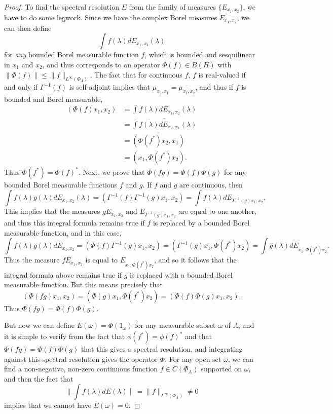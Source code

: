\begin{proof}
    To find the spectral resolution $E$ from the family of measures $\{ E_{x_1,x_2} \}$, we have to do some legwork. Since we have the complex Borel measures $E_{x_1,x_2}$, we can then define
    \[ \int f(\lambda) dE_{x_1,x_2}(\lambda) \]
    for \emph{any} bounded Borel measurable function $f$, which is bounded and sesquilinear in $x_1$ and $x_2$, and thus corresponds to an operator $\Phi(f) \in B(H)$ with $\| \Phi(f) \| \leq \| f \|_{L^\infty(\Phi_A)}$. The fact that for continuous $f$, $f$ is real-valued if and only if $\Gamma^{-1}(f)$ is self-adjoint implies that $\mu_{x_2,x_1} = \overline{\mu_{x_1,x_2}}$, and thus if $f$ is bounded and Borel measurable,
    \begin{align*}
        (\Phi(f) x_1, x_2) &= \int f(\lambda) dE_{x_1,x_2}(\lambda)\\
        &= \overline{ \int \overline{f(\lambda)} dE_{x_2,x_1}(\lambda) }\\
        &= \overline{ (\Phi(f^*) x_2, x_1) }\\
        &= (x_1, \Phi(f^*) x_2).
    \end{align*}
    Thus $\Phi(f^*) = \Phi(f)^*$. Next, we prove that $\Phi(fg) = \Phi(f)\Phi(g)$ for any bounded Borel measurable functions $f$ and $g$. If $f$ and $g$ are continuous, then
    \[ \int f(\lambda) g(\lambda) dE_{x_1,x_2}(\lambda) = (\Gamma^{-1}(f) \Gamma^{-1}(g) x_1, x_2) = \int f(\lambda) dE_{\Gamma^{-1}(g) x_1, x_2}. \]
    This implies that the measures $g E_{x_1,x_2}$ and $E_{\Gamma^{-1}(g) x_1,x_2}$ are equal to one another, and thus this integral formula remains true if $f$ is replaced by a bounded Borel measurable function, and in this case,
    \[ \int f(\lambda) g(\lambda) dE_{x_1,x_2} = (\Phi(f) \Gamma^{-1}(g) x_1, x_2) = (\Gamma^{-1}(g) x_1, \Phi(f^*) x_2) = \int g(\lambda) dE_{x_1, \Phi(f^*) x_2}. \]
    Thus the measure $f E_{x_1,x_2}$ is equal to $E_{x_1, \Phi(f^*) x_2}$, and so it follows that the integral formula above remains true if $g$ is replaced with a bounded Borel measurable function. But this means precisely that
    \[ (\Phi(fg) x_1, x_2) = (\Phi(g) x_1, \Phi(f^*) x_2) = (\Phi(f) \Phi(g) x_1, x_2). \]
    Thus $\Phi(fg) = \Phi(f) \Phi(g)$.

    But now we can define $E(\omega) = \Phi(1_\omega)$ for any measurable subset $\omega$ of $A$, and it is simple to verify from the fact that $\phi(f^*) = \phi(f)^*$ and that $\Phi(fg) = \Phi(f) \Phi(g)$ that this gives a spectral resolution, and integrating against this spectral resolution gives the operator $\Phi$. For any open set $\omega$, we can find a non-negative, non-zero continuous function $f \in C(\Phi_A)$ supported on $\omega$, and then the fact that
    \[ \| \int f(\lambda) dE(\lambda) \| = \| f \|_{L^\infty(\Phi_A)} \neq 0 \]
    implies that we cannot have $E(\omega) = 0$.
\end{proof}

